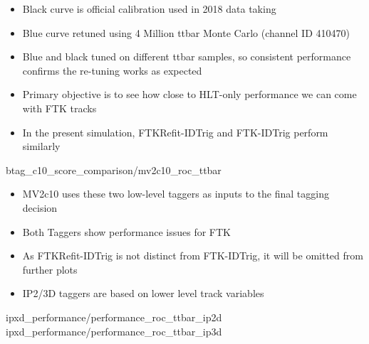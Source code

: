 



    { \begin{itemize}
        \item Black curve is official calibration used in 2018 data taking
        \item Blue curve retuned using 4 Million ttbar Monte Carlo (channel ID 410470)
        \item Blue and black tuned on different ttbar samples,
            so consistent performance confirms the re-tuning works as expected
        \item Primary objective is to see how close to 
            HLT-only performance we can come with FTK tracks
        \item In the present simulation, FTKRefit-IDTrig and FTK-IDTrig perform similarly
    \end{itemize} }
    {btag_c10_score_comparison/mv2c10_roc_ttbar}

    { \begin{itemize}
        \item MV2c10 uses these two low-level taggers as inputs to the final tagging decision
        \item Both Taggers show performance issues for FTK
        \item As FTKRefit-IDTrig is not distinct from FTK-IDTrig,
            it will be omitted from further plots
        \item IP2/3D taggers are based on lower level track variables 
    \end{itemize} }
    {ipxd_performance/performance_roc_ttbar_ip2d}
    {ipxd_performance/performance_roc_ttbar_ip3d}
